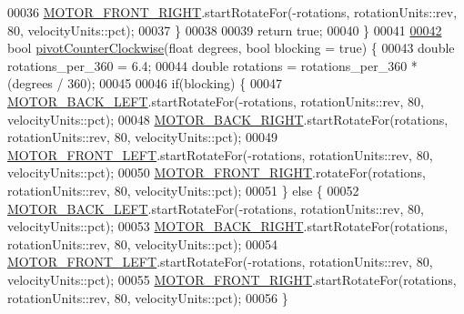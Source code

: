 \begin{DoxyCode}
00036     \mbox{\hyperlink{declarations_8h_ad6a9ea3d338421c5d709c32ae1aa42d8_ad6a9ea3d338421c5d709c32ae1aa42d8}{MOTOR\_FRONT\_RIGHT}}.startRotateFor(-rotations, rotationUnits::rev, 80, 
      velocityUnits::pct);
00037   \}
00038 
00039   \textcolor{keywordflow}{return} \textcolor{keyword}{true};
00040 \}
00041 
\mbox{\hyperlink{auton_8cpp_a241030fa952d5f1fdbe92a97a20e6a36_a241030fa952d5f1fdbe92a97a20e6a36}{00042}} \textcolor{keywordtype}{bool} \mbox{\hyperlink{auton_8cpp_a241030fa952d5f1fdbe92a97a20e6a36_a241030fa952d5f1fdbe92a97a20e6a36}{pivotCounterClockwise}}(\textcolor{keywordtype}{float} degrees, \textcolor{keywordtype}{bool} blocking = \textcolor{keyword}{true}) \{
00043   \textcolor{keywordtype}{double} rotations\_per\_360 = 6.4;
00044   \textcolor{keywordtype}{double} rotations = rotations\_per\_360 * (degrees / 360);
00045 
00046   \textcolor{keywordflow}{if}(blocking) \{
00047   \mbox{\hyperlink{declarations_8h_ab24214b642128d0f3cb67e9b12e7d4fb_ab24214b642128d0f3cb67e9b12e7d4fb}{MOTOR\_BACK\_LEFT}}.startRotateFor(-rotations, rotationUnits::rev, 80, velocityUnits::pct);
00048   \mbox{\hyperlink{declarations_8h_adece81dedf91c2893ba42dc05135a575_adece81dedf91c2893ba42dc05135a575}{MOTOR\_BACK\_RIGHT}}.startRotateFor(rotations, rotationUnits::rev, 80, velocityUnits::pct);
00049   \mbox{\hyperlink{declarations_8h_a8c6f6315caf1d81bf4d4d113d0f7bffc_a8c6f6315caf1d81bf4d4d113d0f7bffc}{MOTOR\_FRONT\_LEFT}}.startRotateFor(-rotations, rotationUnits::rev, 80, velocityUnits::pct);
00050   \mbox{\hyperlink{declarations_8h_ad6a9ea3d338421c5d709c32ae1aa42d8_ad6a9ea3d338421c5d709c32ae1aa42d8}{MOTOR\_FRONT\_RIGHT}}.rotateFor(rotations, rotationUnits::rev, 80, velocityUnits::pct);
00051   \} \textcolor{keywordflow}{else} \{
00052     \mbox{\hyperlink{declarations_8h_ab24214b642128d0f3cb67e9b12e7d4fb_ab24214b642128d0f3cb67e9b12e7d4fb}{MOTOR\_BACK\_LEFT}}.startRotateFor(-rotations, rotationUnits::rev, 80, velocityUnits::pct);
00053   \mbox{\hyperlink{declarations_8h_adece81dedf91c2893ba42dc05135a575_adece81dedf91c2893ba42dc05135a575}{MOTOR\_BACK\_RIGHT}}.startRotateFor(rotations, rotationUnits::rev, 80, velocityUnits::pct);
00054   \mbox{\hyperlink{declarations_8h_a8c6f6315caf1d81bf4d4d113d0f7bffc_a8c6f6315caf1d81bf4d4d113d0f7bffc}{MOTOR\_FRONT\_LEFT}}.startRotateFor(-rotations, rotationUnits::rev, 80, velocityUnits::pct);
00055   \mbox{\hyperlink{declarations_8h_ad6a9ea3d338421c5d709c32ae1aa42d8_ad6a9ea3d338421c5d709c32ae1aa42d8}{MOTOR\_FRONT\_RIGHT}}.startRotateFor(rotations, rotationUnits::rev, 80, velocityUnits::pct);
00056   \}

\end{DoxyCode}
